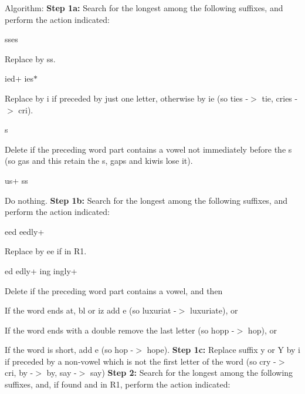 \begin{DoxyParagraph}{Algorithm\+:}
{\bfseries Step 1a\+:} Search for the longest among the following suffixes, and perform the action indicated\+:
\begin{DoxyItemize}
\item sses
\begin{DoxyItemize}
\item Replace by ss.
\end{DoxyItemize}
\item ied+ ies$\ast$
\begin{DoxyItemize}
\item Replace by i if preceded by just one letter, otherwise by ie (so ties -\/$>$ tie, cries -\/$>$ cri).
\end{DoxyItemize}
\item s
\begin{DoxyItemize}
\item Delete if the preceding word part contains a vowel not immediately before the s (so gas and this retain the s, gaps and kiwis lose it).
\end{DoxyItemize}
\item us+ ss
\begin{DoxyItemize}
\item Do nothing. {\bfseries Step 1b\+:} Search for the longest among the following suffixes, and perform the action indicated\+:
\end{DoxyItemize}
\item eed eedly+
\begin{DoxyItemize}
\item Replace by ee if in R1.
\end{DoxyItemize}
\item ed edly+ ing ingly+
\begin{DoxyItemize}
\item Delete if the preceding word part contains a vowel, and then
\item If the word ends at, bl or iz add e (so luxuriat -\/$>$ luxuriate), or
\item If the word ends with a double remove the last letter (so hopp -\/$>$ hop), or
\item If the word is short, add e (so hop -\/$>$ hope). {\bfseries Step 1c\+:} Replace suffix y or Y by i if preceded by a non-\/vowel which is not the first letter of the word (so cry -\/$>$ cri, by -\/$>$ by, say -\/$>$ say) {\bfseries Step 2\+:} Search for the longest among the following suffixes, and, if found and in R1, perform the action indicated\+:

\end{DoxyItemize}
\end{DoxyItemize}
\end{DoxyParagraph}
